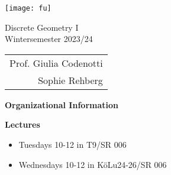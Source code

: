 \documentclass[11pt]{amsart}%
\begin{document}

\texttt{[image: fu]}

\small
{\sc Discrete Geometry I} \\ Wintersemester 2023/24
\normalsize

\vspace{-.9in}
\hspace{4.55in}
\begin{tabular}{r}
\small Prof. Giulia Codenotti\\
\small Sophie Rehberg\\
\end{tabular}

\def\uebung{1}

\setcounter{exerc}{1}

\def\nextex{
\medskip
\noindent
\textbf{Exercise \uebung.\theexerc\ (5 points)}\\
\addtocounter{exerc}{1}
}

\def\nextexc{
\medskip
\noindent
\textbf{Exercise \uebung.\theexerc} (cooperative)\\
\addtocounter{exerc}{1}
}

\def\nextexi{
\medskip
\noindent
\textbf{Exercise \uebung.\theexerc} (individual)\\
\addtocounter{exerc}{1}
}

\begin{center}
\textbf{Organizational Information}\\
\end{center}

\vspace{2\baselineskip}
\noindent
\textbf{Lectures}
\begin{itemize}
 \item Tuesdays 10-12 in T9/SR 006
 \item Wednesdays 10-12 in KöLu24-26/SR 006 
\end{itemize}
\end{document}
